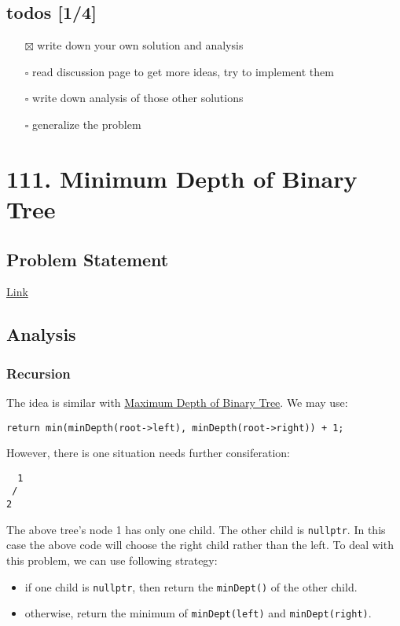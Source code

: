 \documentclass[12pt]{article}
\begin{document}
\subsection{todos [1/4]}
\label{sec:orgafee81a}
\begin{itemize}
\item[{$\boxtimes$}] write down your own solution and analysis
\item[{$\square$}] read discussion page to get more ideas, try to implement them
\item[{$\square$}] write down analysis of those other solutions
\item[{$\square$}] generalize the problem
\end{itemize}
\section{111. Minimum Depth of Binary Tree}
\label{sec:orge0f2476}
\subsection{Problem Statement}
\label{sec:org0581486}
\href{https://leetcode.com/problems/minimum-depth-of-binary-tree/}{Link}
\subsection{Analysis}
\label{sec:orgcede001}
\subsubsection{Recursion}
\label{sec:orgafdb72d}
The idea is similar with \hyperref[org09d5ac3]{Maximum Depth of Binary Tree}. We may use:
\begin{verbatim}
return min(minDepth(root->left), minDepth(root->right)) + 1;
\end{verbatim}

However, there is one situation needs further consiferation:
\begin{verbatim}
  1
 /
2 
\end{verbatim}
The above tree's node 1 has only one child. The other child is \texttt{nullptr}. In this case the above code will choose the right child rather than the left. To deal with this problem, we can use following strategy:
\begin{itemize}
\item if one child is \texttt{nullptr}, then return the \texttt{minDept()} of the other child.
\item otherwise, return the minimum of \texttt{minDept(left)} and \texttt{minDept(right)}.
\end{itemize}
\end{document}
